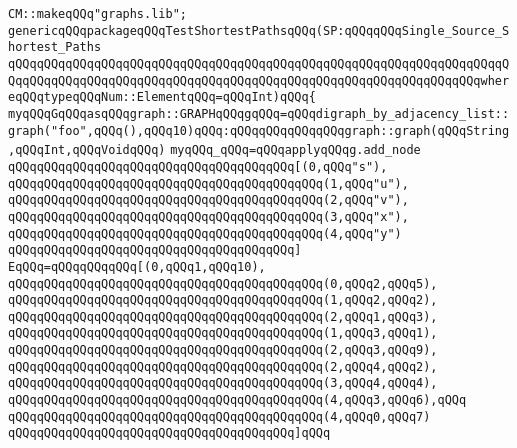 \label{src/lib/graph/test4.pkg}
\verb|CM::makeqQQq"graphs.lib";|\newline
\verb|genericqQQqpackageqQQqTestShortestPathsqQQq(SP:qQQqqQQqSingle_Source_Shortest_Paths|\newline
\verb|qQQqqQQqqQQqqQQqqQQqqQQqqQQqqQQqqQQqqQQqqQQqqQQqqQQqqQQqqQQqqQQqqQQqqQQqqQQqqQQqqQQqqQQqqQQqqQQqqQQqqQQqqQQqqQQqqQQqqQQqqQQqqQQqqQQqqQQqwhereqQQqtypeqQQqNum::ElementqQQq=qQQqInt)qQQq{|\newline
\verb|myqQQqGqQQqasqQQqgraph::GRAPHqQQqgqQQq=qQQqdigraph_by_adjacency_list::graph("foo",qQQq(),qQQq10)qQQq:qQQqqQQqqQQqqQQqgraph::graph(qQQqString,qQQqInt,qQQqVoidqQQq)|\newline
\verb|myqQQq_qQQq=qQQqapplyqQQqg.add_node|\newline
\verb|qQQqqQQqqQQqqQQqqQQqqQQqqQQqqQQqqQQqqQQq[(0,qQQq"s"),|\newline
\verb|qQQqqQQqqQQqqQQqqQQqqQQqqQQqqQQqqQQqqQQqqQQq(1,qQQq"u"),|\newline
\verb|qQQqqQQqqQQqqQQqqQQqqQQqqQQqqQQqqQQqqQQqqQQq(2,qQQq"v"),|\newline
\verb|qQQqqQQqqQQqqQQqqQQqqQQqqQQqqQQqqQQqqQQqqQQq(3,qQQq"x"),|\newline
\verb|qQQqqQQqqQQqqQQqqQQqqQQqqQQqqQQqqQQqqQQqqQQq(4,qQQq"y")|\newline
\verb|qQQqqQQqqQQqqQQqqQQqqQQqqQQqqQQqqQQqqQQq]|\newline
\verb|EqQQq=qQQqqQQqqQQq[(0,qQQq1,qQQq10),|\newline
\verb|qQQqqQQqqQQqqQQqqQQqqQQqqQQqqQQqqQQqqQQqqQQq(0,qQQq2,qQQq5),|\newline
\verb|qQQqqQQqqQQqqQQqqQQqqQQqqQQqqQQqqQQqqQQqqQQq(1,qQQq2,qQQq2),|\newline
\verb|qQQqqQQqqQQqqQQqqQQqqQQqqQQqqQQqqQQqqQQqqQQq(2,qQQq1,qQQq3),|\newline
\verb|qQQqqQQqqQQqqQQqqQQqqQQqqQQqqQQqqQQqqQQqqQQq(1,qQQq3,qQQq1),|\newline
\verb|qQQqqQQqqQQqqQQqqQQqqQQqqQQqqQQqqQQqqQQqqQQq(2,qQQq3,qQQq9),|\newline
\verb|qQQqqQQqqQQqqQQqqQQqqQQqqQQqqQQqqQQqqQQqqQQq(2,qQQq4,qQQq2),|\newline
\verb|qQQqqQQqqQQqqQQqqQQqqQQqqQQqqQQqqQQqqQQqqQQq(3,qQQq4,qQQq4),|\newline
\verb|qQQqqQQqqQQqqQQqqQQqqQQqqQQqqQQqqQQqqQQqqQQq(4,qQQq3,qQQq6),qQQq|\newline
\verb|qQQqqQQqqQQqqQQqqQQqqQQqqQQqqQQqqQQqqQQqqQQq(4,qQQq0,qQQq7)|\newline
\verb|qQQqqQQqqQQqqQQqqQQqqQQqqQQqqQQqqQQqqQQq]qQQq|\newline
